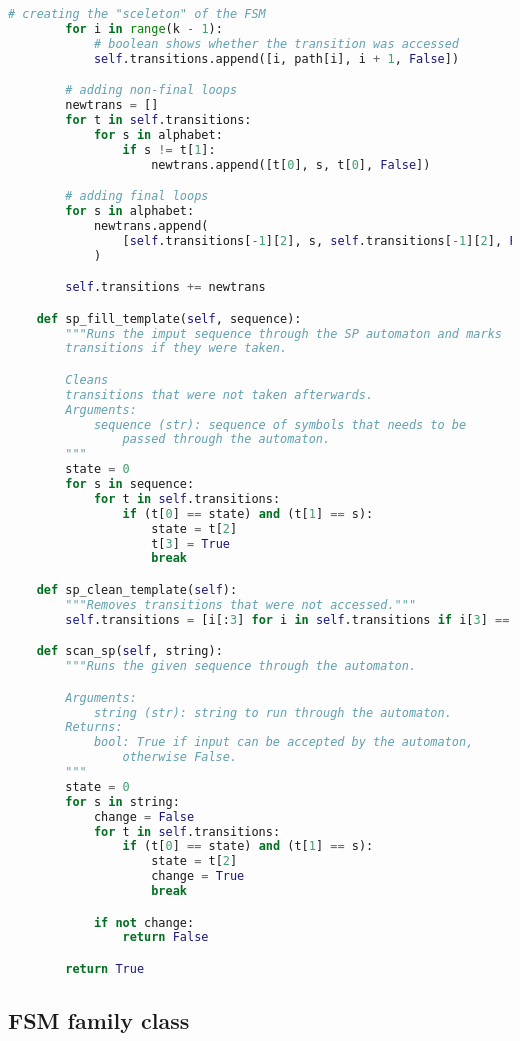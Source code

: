 \begin{lstlisting}[language=Python]
        # creating the "sceleton" of the FSM
        for i in range(k - 1):
            # boolean shows whether the transition was accessed
            self.transitions.append([i, path[i], i + 1, False])

        # adding non-final loops
        newtrans = []
        for t in self.transitions:
            for s in alphabet:
                if s != t[1]:
                    newtrans.append([t[0], s, t[0], False])

        # adding final loops
        for s in alphabet:
            newtrans.append(
                [self.transitions[-1][2], s, self.transitions[-1][2], False]
            )

        self.transitions += newtrans

    def sp_fill_template(self, sequence):
        """Runs the imput sequence through the SP automaton and marks
        transitions if they were taken.

        Cleans
        transitions that were not taken afterwards.
        Arguments:
            sequence (str): sequence of symbols that needs to be
                passed through the automaton.
        """
        state = 0
        for s in sequence:
            for t in self.transitions:
                if (t[0] == state) and (t[1] == s):
                    state = t[2]
                    t[3] = True
                    break

    def sp_clean_template(self):
        """Removes transitions that were not accessed."""
        self.transitions = [i[:3] for i in self.transitions if i[3] == True]

    def scan_sp(self, string):
        """Runs the given sequence through the automaton.

        Arguments:
            string (str): string to run through the automaton.
        Returns:
            bool: True if input can be accepted by the automaton,
                otherwise False.
        """
        state = 0
        for s in string:
            change = False
            for t in self.transitions:
                if (t[0] == state) and (t[1] == s):
                    state = t[2]
                    change = True
                    break

            if not change:
                return False

        return True
\end{lstlisting}

\subsection*{FSM family class}

